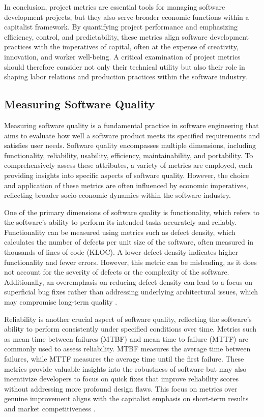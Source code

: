 \begin{refsection}
In conclusion, project metrics are essential tools for managing software development projects, but they also serve broader economic functions within a capitalist framework. By quantifying project performance and emphasizing efficiency, control, and predictability, these metrics align software development practices with the imperatives of capital, often at the expense of creativity, innovation, and worker well-being. A critical examination of project metrics should therefore consider not only their technical utility but also their role in shaping labor relations and production practices within the software industry.

\subsection{Measuring Software Quality}

Measuring software quality is a fundamental practice in software engineering that aims to evaluate how well a software product meets its specified requirements and satisfies user needs. Software quality encompasses multiple dimensions, including functionality, reliability, usability, efficiency, maintainability, and portability. To comprehensively assess these attributes, a variety of metrics are employed, each providing insights into specific aspects of software quality. However, the choice and application of these metrics are often influenced by economic imperatives, reflecting broader socio-economic dynamics within the software industry.

One of the primary dimensions of software quality is functionality, which refers to the software's ability to perform its intended tasks accurately and reliably. Functionality can be measured using metrics such as defect density, which calculates the number of defects per unit size of the software, often measured in thousands of lines of code (KLOC). A lower defect density indicates higher functionality and fewer errors. However, this metric can be misleading, as it does not account for the severity of defects or the complexity of the software. Additionally, an overemphasis on reducing defect density can lead to a focus on superficial bug fixes rather than addressing underlying architectural issues, which may compromise long-term quality \cite[pp.~29-32]{Jones2010SoftwareQuality}.

Reliability is another crucial aspect of software quality, reflecting the software's ability to perform consistently under specified conditions over time. Metrics such as mean time between failures (MTBF) and mean time to failure (MTTF) are commonly used to assess reliability. MTBF measures the average time between failures, while MTTF measures the average time until the first failure. These metrics provide valuable insights into the robustness of software but may also incentivize developers to focus on quick fixes that improve reliability scores without addressing more profound design flaws. This focus on metrics over genuine improvement aligns with the capitalist emphasis on short-term results and market competitiveness \cite[pp.~105-108]{ORegan2002SoftwareQuality}.


\end{refsection}
